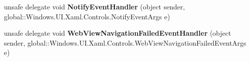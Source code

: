 \begin{DoxyCompactItemize}
\item 
\mbox{\label{namespace_windows_1_1_u_i_1_1_xaml_1_1_controls_a0de6d2a9f60f0f7b18f1e3035dd47611}} 
unsafe delegate void {\bfseries Notify\+Event\+Handler} (object sender, global\+::\+Windows.\+U\+I.\+Xaml.\+Controls.\+Notify\+Event\+Args e)
\item 
\mbox{\label{namespace_windows_1_1_u_i_1_1_xaml_1_1_controls_ab4e245c2f8c393917d3e35190e0b92b7}} 
unsafe delegate void {\bfseries Web\+View\+Navigation\+Failed\+Event\+Handler} (object sender, global\+::\+Windows.\+U\+I.\+Xaml.\+Controls.\+Web\+View\+Navigation\+Failed\+Event\+Args e)
\end{DoxyCompactItemize}
